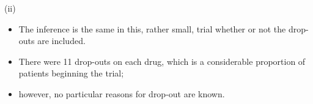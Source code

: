 \documentclass[a4paper,12pt]{article}
\begin{document}
(ii) 
\begin{itemize}
\item The inference is the same in this, rather small, trial whether or not the
drop-outs are included. 
\item There were 11 drop-outs on each drug, which is a
considerable proportion of patients beginning the trial; 
\item however, no particular
reasons for drop-out are known.
\end{itemize}
\end{document}
